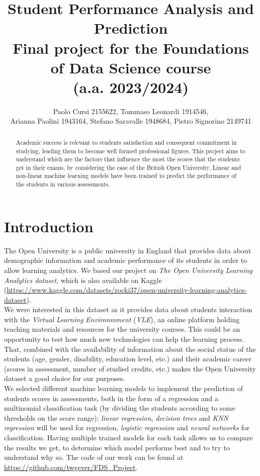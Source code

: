 \documentclass{article}
\title{Student Performance Analysis and Prediction \\ Final project for the Foundations of Data Science course \\(a.a. 2023/2024) }
\author{Paolo Cursi 2155622, Tommaso Leonardi 1914546, \\Arianna Paolini 1943164, Stefano Saravalle 1948684, Pietro Signorino 2149741}
\begin{document}
\maketitle

\begin{abstract}
Academic success is relevant to students satisfaction and consequent commitment in studying, leading them to become well formed professional figures. This project aims to understand which are the factors that influence the most the scores that the students get in their exams, by considering the case of the British Open University. Linear and non-linear machine learning models have been trained to predict the performance of the students in various assessments.
\end{abstract}

\section{Introduction}
The Open University is a public university in England that provides data about demographic information and academic performance of its students in order to allow learning analytics. We based our project on \textit{The Open University Learning Analytics dataset}, which is also available on Kaggle (\url{https://www.kaggle.com/datasets/rocki37/open-university-learning-analytics-dataset}). \\

We were interested in this dataset as it provides data about students interaction with the \textit{Virtual Learning Environmment} (\textit{VLE}), an online platform holding teaching materials and resources for the university courses. This could be an opportunity to test how much new technologies can help the learning process. That, combined with the availability of information about the social status of the students (age, gender, disability, education level, etc.) and their academic career (scores in assessment, number of studied credits, etc.) makes the Open University dataset a good choice for our purposes. \\

We selected different machine learning models to implement the prediction of students scores in assessments, both in the form of a regression and a multinomial classification task (by dividing the students according to some thresholds on the score range): \textit{linear regression}, \textit{decision trees} and \textit{KNN regression} will be used for regression, \textit{logistic regression }and \textit{neural networks} for classification. Having multiple trained models for each task allows us to compare the results we get, to determine which model performs best and to try to understand why so. The code of our work can be found at \url{https://github.com/twgever/FDS_Project}. %
\end{document}
